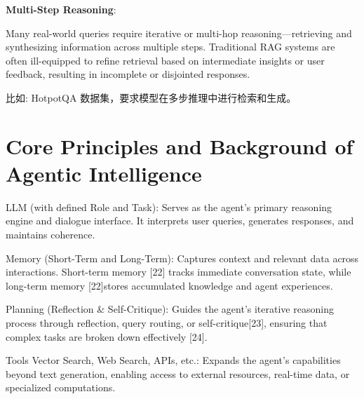 \documentclass{article}
\begin{document}
\textbf{Multi-Step Reasoning}:

Many real-world queries require iterative or multi-hop reasoning—retrieving and synthesizing information across
multiple steps. 
Traditional RAG systems are often ill-equipped to refine retrieval based on intermediate insights or user
feedback, resulting in incomplete or disjointed responses.

比如: HotpotQA 数据集，要求模型在多步推理中进行检索和生成。

\section{Core Principles and Background of Agentic Intelligence}

LLM (with defined Role and Task): Serves as the agent’s primary reasoning engine and dialogue interface.
It interprets user queries, generates responses, and maintains coherence.

Memory (Short-Term and Long-Term): Captures context and relevant data across interactions. Short-term
memory [22] tracks immediate conversation state, while long-term memory [22]stores accumulated knowledge
and agent experiences.

Planning (Reflection \& Self-Critique): Guides the agent’s iterative reasoning process through reflection,
query routing, or self-critique[23], ensuring that complex tasks are broken down effectively [24].

Tools Vector Search, Web Search, APIs, etc.: Expands the agent’s capabilities beyond text generation,
enabling access to external resources, real-time data, or specialized computations.



\end{document}
